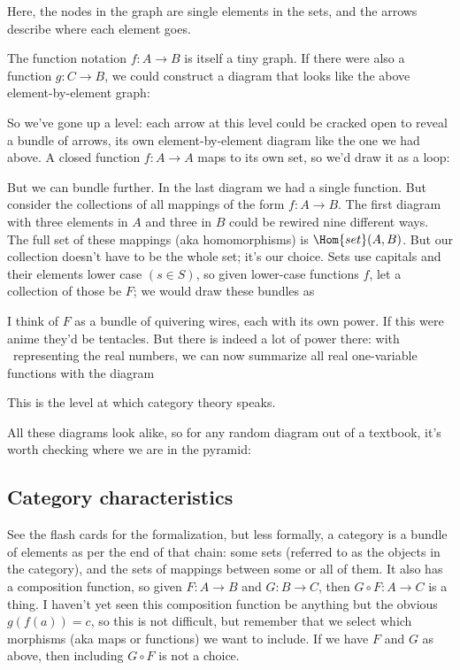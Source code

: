 \documentclass[11pt]{article}
\begin{document}
Here, the nodes in the graph are single elements in the sets, and the arrows describe
where each element goes.

The function notation $f:A\to B$ is itself a tiny graph. If there were also a function
$g:C\to B$, we could construct a diagram that looks like the above element-by-element graph:

So we've gone up a level: each arrow at this level could be cracked open to reveal
a bundle of arrows, its own element-by-element diagram like the one we had above. A
closed function $f:A\to A$ maps to its own set, so we'd draw it as a loop:


But we can bundle further. In the last diagram we had a single function. But
consider the collections of all
mappings of the form $f:A\to B$. The first diagram with three elements in $A$ and
three in $B$ could be rewired nine different ways. The full set of these mappings (aka
homomorphisms) is $\Hom{set}(A, B)$. But our collection doesn't have to be the whole set;
it's our choice. Sets use capitals and their elements lower case $(s\in S)$, so
given lower-case functions $f$, let a collection of those be $F$; we would draw these
bundles as


I think of $F$ as a bundle of quivering wires, each with its own power. If this were anime
they'd be tentacles. But there is indeed a lot of power there: with \Re\ representing the
real numbers, we can now summarize all real one-variable functions with the diagram 

This is the level at which category theory speaks.

All these diagrams look alike, so for any random diagram out of a textbook, it's
worth checking where we are in the pyramid:

\subsection{Category characteristics}
See the flash cards for the formalization, but less formally,
a category is a bundle of elements as per the end of that chain: some sets
(referred to as the objects in the category), and the sets of mappings between some
or all of them.  It also has a composition function, so given $F:A\to B$
and $G:B\to C$, then $G\circ F:A\to C$ is a thing. I haven't yet seen this composition
function be anything but the obvious $g(f(a)) = c$, so this is not difficult, but remember
that we select which morphisms (aka maps or functions) we want to include. If we have $F$
and $G$ as above, then including $G\circ F$ is not a choice.
\end{document}
